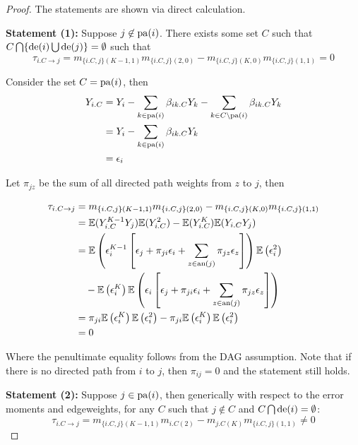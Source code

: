 \documentclass[]{article}
\newcommand{\E}{\mathbb{E}}
\newcommand{\an}{{\rm an}}       %
\newcommand{\de}{{\rm de}}       %
\newcommand{\pa}{{\rm pa}}       %
\begin{document}
\begin{proof}
The statements are shown via direct calculation.

\textbf{Statement (1):}
Suppose $j \not\in \pa(i)$. There exists some set $C$ such that $C \bigcap \{\de(i)\bigcup \de(j)\}= \emptyset$ such that
\[\tau _{i.C\rightarrow j} =  m_{\{i.C,j\}(K-1,1)} m_{\{i.C,j\}(2,0)} - m_{\{i.C,j\}(K,0)}m_{\{i.C,j\}(1,1)} = 0 \]

Consider the set $C = \pa(i)$, then
\begin{equation}
\begin{aligned}
Y_{i.C} &= Y_i - \sum_{k \in \pa(i)}\beta_{ik.C}Y_{k} -\sum_{k \in C \setminus \pa(i)}\beta_{ik.C}Y_{k}\\
& = Y_i - \sum_{k \in \pa(i)}\beta_{ik.C}Y_{k}\\
& = \epsilon_i
\end{aligned}
\end{equation}

Let $\pi_{jz}$ be the sum of all directed path weights from $z$ to $j$, then

\begin{equation}
\begin{aligned}
\tau _{i.C\rightarrow j} &=  m_{\{i.C,j\}(K-1,1)} m_{\{i.C,j\}(2,0)} - m_{\{i.C,j\}(K,0)}m_{\{i.C,j\}(1,1)}
\\
& = \E(Y_{i.C}^{K-1}Y_j) \E(Y_{i.C}^2) - \E(Y_{i.C}^K) \E(Y_{i.C} Y_j)
\\
&=  \E\left(\epsilon_i^{K-1} \left[\epsilon_j + \pi_{ji}\epsilon_i + \sum_{z \in \an(j)} \pi_{jz}\epsilon_z \right]\right)
\E\left(\epsilon_i^2\right)
\\
&\quad - \E\left(\epsilon_i^K\right) \E\left(\epsilon_i  \left[\epsilon_j + \pi_{ji}\epsilon_i + \sum_{z \in \an(j)} \pi_{jz}\epsilon_z \right]\right)
\\
&=  \pi_{ji}\E\left(\epsilon_i^K \right)
\E\left(\epsilon_i^2\right) - \pi_{ji}\E\left(\epsilon_i^K\right) \E\left(\epsilon_i^2\right)
\\
& = 0
\end{aligned}
\end{equation}

Where the penultimate equality follows from the DAG assumption. Note that if there is no directed path from $i$ to $j$, then $\pi_{ij} = 0$ and the statement still holds.

\textbf{Statement (2):}
Suppose $j \in \pa(i)$, then generically with respect to the error moments and edgeweights, for any $C$ such that $j \not \in C$ and $C \bigcap \de(i) = \emptyset$:
\[\tau _{i.C\rightarrow j} = m_{\{i.C,j\}(K-1,1)} m_{i.C(2)} - m_{j.C(K)}m_{\{i.C,j\}(1,1)} \neq 0 \]


\end{proof}
\end{document}
